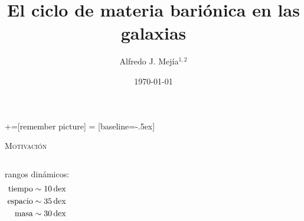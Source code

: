 \documentclass[xcolor=dvipsnames,4pt,hyperref={colorlinks,citecolor=black,linkcolor=black,urlcolor=black}]{beamer}
\begin{document}
+=[remember picture]
 = [baseline=-.5ex]

\begin{frame}
\title{El ciclo de materia bariónica en las galaxias}
\author{Alfredo J. Mej\'ia$^{1,2}$}

\date{\today}


\maketitle
\end{frame}

\begin{frame}{\textsc{Motivación}}
\begin{columns}
rangos dinámicos:
\begin{subequations}
\begin{align}
\text{tiempo}  &\sim \unit[10]{dex} \nonumber\\
\text{espacio} &\sim \unit[35]{dex} \nonumber\\
\text{masa}    &\sim \unit[30]{dex} \nonumber
\end{align}
\end{subequations}
\end{columns}
\end{frame}
\end{document}
